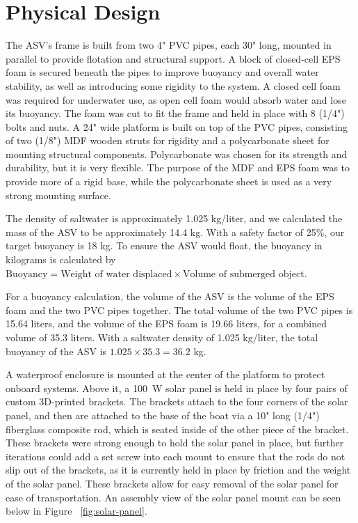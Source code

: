 \section{Physical Design}

The ASV's frame is built from two 4" PVC pipes, each 30" long, mounted in parallel to provide flotation and structural support. A block of closed-cell EPS foam is secured beneath the pipes to improve buoyancy and overall water stability, as well as introducing some rigidity to the system. A closed cell foam was required for underwater use, as open cell foam would absorb water and lose its buoyancy. The foam was cut to fit the frame and held in place with 8 (1/4") bolts and nuts. A 24" wide platform is built on top of the PVC pipes, consisting of two (1/8") MDF wooden struts for rigidity and a polycarbonate sheet for mounting structural components. Polycarbonate was chosen for its strength and durability, but it is very flexible. The purpose of the MDF and EPS foam was to provide more of a rigid base, while the polycarbonate sheet is used as a very strong mounting surface. 

The density of saltwater is approximately 1.025 kg/liter, and we calculated the mass of the ASV to be approximately 14.4 kg. With a safety factor of 25\%, our target buoyancy is 18 kg. To ensure the ASV would float, the buoyancy in kilograms is calculated by \(\text{Buoyancy} = \text{Weight of water displaced} \times \text{Volume of submerged object}\). 

For a buoyancy calculation, the volume of the ASV is the volume of the EPS foam and the two PVC pipes together. The total volume of the two PVC pipes is 15.64 liters, and the volume of the EPS foam is 19.66 liters, for a combined volume of 35.3 liters. With a saltwater density of 1.025 kg/liter, the total buoyancy of the ASV is \(1.025 \times 35.3 = 36.2 \) kg.

A waterproof enclosure is mounted at the center of the platform to protect onboard systems. Above it, a \SI{100}{\watt} solar panel is held in place by four pairs of custom 3D-printed brackets. The brackets attach to the four corners of the solar panel, and then are attached to the base of the boat via a 10" long (1/4") fiberglass composite rod, which is seated inside of the other piece of the bracket. These brackets were strong enough to hold the solar panel in place, but further iterations could add a set screw into each mount to ensure that the rods do not slip out of the brackets, as it is currently held in place by friction and the weight of the solar panel. These brackets allow for easy removal of the solar panel for ease of transportation. An assembly view of the solar panel mount can be seen below in Figure ~\ref{fig:solar-panel}.

